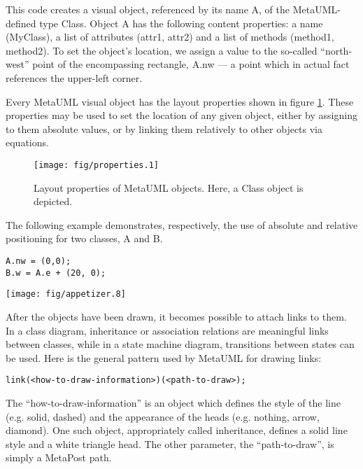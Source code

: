 \documentclass{article}
\newcommand{\code}{\ttfamily}
\begin{document}
This code creates a visual object, referenced by its name {\code A}, of the MetaUML-defined type {\code Class}. 
Object {\code A} has the following content properties: a name
({\code MyClass}), a list of attributes ({\code attr1}, {\code attr2})
and a list of methods ({\code method1}, {\code method2}). To set the object's location, we assign a value to the 
so-called ``north-west'' point of the encompassing rectangle, {\code A.nw} --- a point which in actual fact references 
the upper-left corner.

Every MetaUML visual object has the layout properties shown in figure \ref{fig:properties}. 
These properties may be used to set the location of any given object, either by assigning to them absolute values,
or by linking them relatively to other objects via equations.

\begin{figure}
\centering
\texttt{[image: fig/properties.1]}
\caption{Layout properties of MetaUML objects. Here, a {\code Class} object is depicted.}
\label{fig:properties}
\end{figure}
 
The following example demonstrates, respectively, the use of absolute and relative positioning for two classes, {\code A} and {\code  B}.

\begin{multicols}{2}
\begin{verbatim}
A.nw = (0,0);
B.w = A.e + (20, 0);
\end{verbatim}
\columnbreak
\texttt{[image: fig/appetizer.8]}
\end{multicols}

After the objects have been drawn, it becomes possible to attach links to them. In a class diagram, inheritance
or association relations are meaningful links between classes, while in a state machine diagram, transitions between 
states can be used. Here is the general pattern used by MetaUML for drawing links:

\begin{verbatim}
link(<how-to-draw-information>)(<path-to-draw>);
\end{verbatim}

The ``how-to-draw-information'' is an object which defines the style of the line (e.g. solid, dashed) and the appearance
of the heads (e.g. nothing, arrow, diamond). One such object, appropriately called {\code inheritance}, defines a solid
line style and a white triangle head. The other parameter, the ``path-to-draw'', is simply a MetaPost path.
\end{document}
